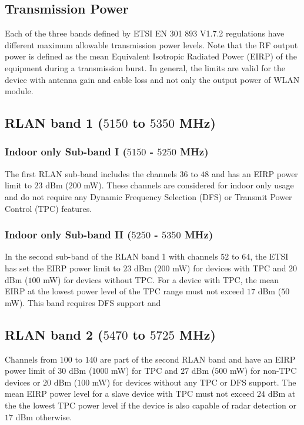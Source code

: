 \begin{itemize}
\section{Transmission Power}

Each of the three bands defined by ETSI EN 301 893 V1.7.2 regulations \cite{LBT-ETSI-2014} have different maximum allowable transmission power levels. Note that the RF output power is defined as the mean Equivalent Isotropic Radiated Power (EIRP) of the equipment during a transmission burst. In general, the limits are valid for the device with antenna gain and cable loss and not only the output power of WLAN module.

\subsection{RLAN band 1 ($5150$ to $5350$ MHz)}

\subsubsection{Indoor only Sub-band I ($5150$ - $5250$ MHz)}
The first RLAN sub-band includes the channels $36$ to $48$ and has an EIRP power limit to $23$ dBm ($200$ mW). These channels are considered for indoor only usage and do not require any Dynamic Frequency Selection (DFS) or Transmit Power Control (TPC) features. 

\subsubsection{Indoor only Sub-band II ($5250$ - $5350$ MHz)}
In the second sub-band of the RLAN band 1 with channels $52$ to $64$, the ETSI has set the EIRP power limit to $23$ dBm ($200$ mW) for devices with TPC and $20$ dBm ($100$ mW) for devices without TPC. For a device with TPC, the mean EIRP at the lowest power level of the TPC range must not exceed $17$ dBm ($50$ mW). This band requires DFS support and 

\subsection{RLAN band 2 ($5470$ to $5725$ MHz)}

Channels from $100$ to $140$ are part of the second RLAN band and have an EIRP power limit of $30$ dBm ($1000$ mW) for TPC and $27$ dBm ($500$ mW) for non-TPC devices or $20$ dBm ($100$ mW) for devices without any TPC or DFS support. The mean EIRP power level for a slave device with TPC must not exceed $24$ dBm at the the lowest TPC power level if the device is also capable of radar detection or $17$ dBm otherwise. 


\end{itemize}
